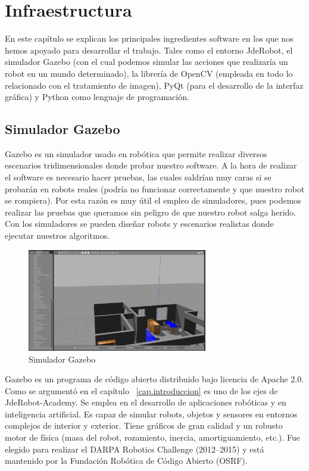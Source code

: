 \chapter{Infraestructura}\label{cap.infraestructura}
En este capítulo se explican los principales ingredientes software en los que nos hemos apoyado  para desarrollar el trabajo. Tales como el entorno JdeRobot, el simulador Gazebo (con el cual podemos simular las acciones que realizaría un robot en un mundo determinado), la librería de OpenCV (empleada en todo lo relacionado con el tratamiento de imagen), PyQt (para el desarrollo de la interfaz gráfica) y Python como lenguaje de programación.

\section{Simulador Gazebo}
Gazebo es un simulador usado en robótica que permite realizar diversos escenarios tridimensionales donde probar nuestro software. A la hora de realizar el software es necesario hacer pruebas, las cuales saldrían muy caras si se probarán en robots reales (podría no funcionar correctamente y que nuestro robot se rompiera). Por esta razón es muy útil el empleo de simuladores, pues podemos realizar las pruebas que queramos sin peligro de que nuestro robot salga herido. Con los simuladores se pueden diseñar robots y escenarios realistas donde ejecutar nuestros algoritmos.

\begin{figure}[H]
  \begin{center}
    \includegraphics[width=0.7\textwidth]{figures/Infraestructura/gazebo.png}
		\caption{Simulador Gazebo}
		\label{fig.gazebo}
		\end{center}
\end{figure}

Gazebo es un programa de código abierto distribuido bajo licencia de Apache 2.0. Como se argumentó en el capítulo ~\ref{cap.introduccion} es uno de los ejes de JdeRobot-Academy.  Se emplea en el desarrollo de aplicaciones robóticas y en inteligencia artificial. Es capaz de simular robots, objetos y sensores en entornos complejos de interior y exterior. Tiene gráficos de gran calidad y un robusto motor de física (masa del robot, rozamiento, inercia, amortiguamiento, etc.). Fue elegido para realizar el DARPA Robotics Challenge (2012--2015) y está mantenido por la Fundación Robótica de Código Abierto (OSRF).\\


